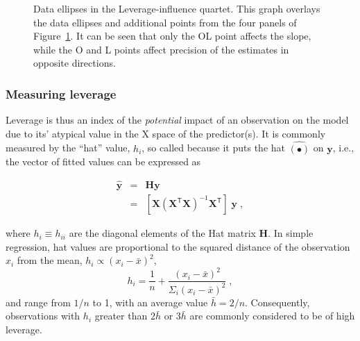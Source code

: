 \documentclass[
  letterpaper,
  10pt,
  krantz2]{krantz}
\begin{document}
{\begin{figure}[H]


\caption{\label{fig-levdemo2}Data ellipses in the Leverage-influence
quartet. This graph overlays the data ellipses and additional points
from the four panels of Figure~\ref{fig-levdemo2}. It can be seen that
only the OL point affects the slope, while the O and L points affect
precision of the estimates in opposite directions.}

\end{figure}%

\subsubsection{Measuring leverage}\label{measuring-leverage}

Leverage is thus an index of the \emph{potential} impact of an
observation on the model due to its' atypical value in the X space of
the predictor(s). It is commonly measured by the ``hat'' value, \(h_i\),
so called because it puts the hat \(\hat{(\bullet)}\) on \(\mathbf{y}\),
i.e., the vector of fitted values can be expressed as

\begin{eqnarray*}
\hat{\mathbf{y}} & = & \mathbf{H} \mathbf{y} \\
                 & = & [\mathbf{X} (\mathbf{X}^\textsf{T} \mathbf{X})^{-1} \mathbf{X}^\textsf{T}] \; \mathbf{y} \; ,
\end{eqnarray*}

where \(h_i \equiv h_{ii}\) are the diagonal elements of the Hat matrix
\(\mathbf{H}\). In simple regression, hat values are proportional to the
squared distance of the observation \(x_i\) from the mean,
\(h_i \propto (x_i - \bar{x})^2\), \[
h_i = \frac{1}{n} + \frac{(x_i - \bar{x})^2}{\Sigma_i (x_i - \bar{x})^2} \; ,
\] and range from \(1/n\) to 1, with an average value \(\bar{h} = 2/n\).
Consequently, observations with \(h_i\) greater than \(2 \bar{h}\) or
\(3 \bar{h}\) are commonly considered to be of high leverage.

}
\end{document}
